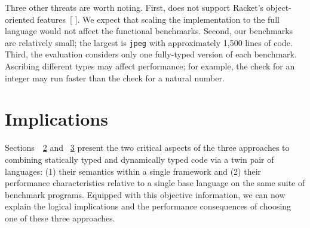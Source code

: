 \documentclass[screen=true, 10pt, acmsmall]{acmart}
\makeatletter
\newcommand{\sectionNewpage}{}
\newcommand{\ChapRef}[2]{\SecRef{#1}{#2}}
\newcommand{\SecRef}[2]{section~#1}
\newcommand{\SectionNumberLink}[2]{\hyperref[#1]{#2}}
\newcommand{\Scribtexttt}[1]{{\texttt{#1}}}
\newcommand{\Sendabbrev}[1]{#1\@}
\let\SOriginalthesubsection\thesubsection
\newcommand{\Ssection}[2]{\section[#1]{#2}\let\thesubsection\SOriginalthesubsection}
\newcommand{\AutobibLink}[1]{\color{ACMPurple}{#1}}
\newcommand{\Autobibref}[1]{#1}
\providecommand{\AutobibLink}[1]{#1}
\renewcommand{\SecRef}[2]{~#1}
\newcommand{\foshort}{1}
\makeatother
\begin{document}
Three other threats are worth noting.
First, \relax{$\mathsf{TR}\mhyphen\mathsf{\foshort}$} does not support Racket{'}s object{-}oriented features\Autobibref{~[\hyperref[t:x28autobib_x22Asumu_Takikawax2c_Daniel_Felteyx2c_Earl_Deanx2c_Robert_Bruce_Findlerx2c_Matthew_Flattx2c_Sam_Tobinx2dHochstadtx2c_and_Matthias_FelleisenTowards_Practical_Gradual_TypingEuropean_Conference_on_Objectx2dOriented_Programmingx2c_ppx2e_4x2dx2d272015x22x29]{\AutobibLink{Takikawa et al\Sendabbrev{.}}} \hyperref[t:x28autobib_x22Asumu_Takikawax2c_Daniel_Felteyx2c_Earl_Deanx2c_Robert_Bruce_Findlerx2c_Matthew_Flattx2c_Sam_Tobinx2dHochstadtx2c_and_Matthias_FelleisenTowards_Practical_Gradual_TypingEuropean_Conference_on_Objectx2dOriented_Programmingx2c_ppx2e_4x2dx2d272015x22x29]{\AutobibLink{2015}}]}.
We expect that scaling the implementation to the full language would not affect the functional benchmarks.
Second, our benchmarks are relatively small; the largest is \Scribtexttt{jpeg} with
 approximately 1,500 lines of code.
Third, the evaluation considers only one fully{-}typed version of each benchmark.
Ascribing different types may affect performance;
 for example, the check for an integer may run faster than the
 check for a natural number.

\sectionNewpage

\Ssection{Implications}{Implications}\label{t:x28part_x22secx3aimplicationsx22x29}

Sections~\ChapRef{\SectionNumberLink{t:x28part_x22secx3adesignx22x29}{2}}{Syntax, Types, and Semantics} and \ChapRef{\SectionNumberLink{t:x28part_x22secx3aevaluationx22x29}{3}}{Performance} present the two critical aspects of the three
approaches to combining statically typed and dynamically typed code via a
twin pair of languages: (1) their semantics within a single framework and
(2) their performance characteristics relative to a single base language on
the same suite of benchmark programs.
Equipped with this objective
information, we can now explain the logical implications and the performance consequences of
choosing one of these three approaches.
\end{document}
